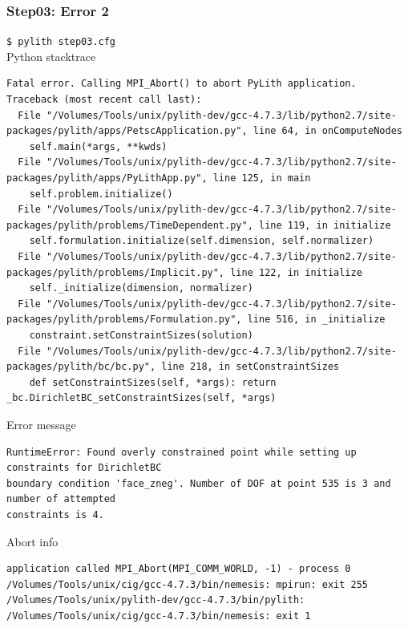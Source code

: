 \documentclass{beamer}
\newcommand{\cmd}[1]{{\tiny\tt \color{ltred}#1}}
\newcommand{\errlabel}[1]{{\small \color{blue}#1}}
\begin{document}
\begin{frame}[fragile]
  \frametitle{Step03: Error 2}

\cmd{\$ pylith step03.cfg}\\
\errlabel{Python stacktrace}
\begin{lstlisting}
Fatal error. Calling MPI_Abort() to abort PyLith application.
Traceback (most recent call last):
  File "/Volumes/Tools/unix/pylith-dev/gcc-4.7.3/lib/python2.7/site-packages/pylith/apps/PetscApplication.py", line 64, in onComputeNodes
    self.main(*args, **kwds)
  File "/Volumes/Tools/unix/pylith-dev/gcc-4.7.3/lib/python2.7/site-packages/pylith/apps/PyLithApp.py", line 125, in main
    self.problem.initialize()
  File "/Volumes/Tools/unix/pylith-dev/gcc-4.7.3/lib/python2.7/site-packages/pylith/problems/TimeDependent.py", line 119, in initialize
    self.formulation.initialize(self.dimension, self.normalizer)
  File "/Volumes/Tools/unix/pylith-dev/gcc-4.7.3/lib/python2.7/site-packages/pylith/problems/Implicit.py", line 122, in initialize
    self._initialize(dimension, normalizer)
  File "/Volumes/Tools/unix/pylith-dev/gcc-4.7.3/lib/python2.7/site-packages/pylith/problems/Formulation.py", line 516, in _initialize
    constraint.setConstraintSizes(solution)
  File "/Volumes/Tools/unix/pylith-dev/gcc-4.7.3/lib/python2.7/site-packages/pylith/bc/bc.py", line 218, in setConstraintSizes
    def setConstraintSizes(self, *args): return _bc.DirichletBC_setConstraintSizes(self, *args)
\end{lstlisting}
\errlabel{Error message}
\begin{lstlisting}
RuntimeError: Found overly constrained point while setting up constraints for DirichletBC
boundary condition 'face_zneg'. Number of DOF at point 535 is 3 and number of attempted
constraints is 4.
\end{lstlisting}
\errlabel{Abort info}
\begin{lstlisting}
application called MPI_Abort(MPI_COMM_WORLD, -1) - process 0
/Volumes/Tools/unix/cig/gcc-4.7.3/bin/nemesis: mpirun: exit 255
/Volumes/Tools/unix/pylith-dev/gcc-4.7.3/bin/pylith:
/Volumes/Tools/unix/cig/gcc-4.7.3/bin/nemesis: exit 1
\end{lstlisting}

\end{frame}
\end{document}
